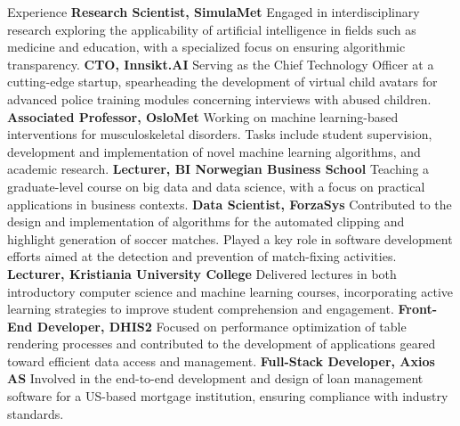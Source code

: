 \begin{rubric}{Experience}
%
\entry*[2021 -- present]%
\textbf{Research Scientist, SimulaMet} Engaged in interdisciplinary research exploring the applicability of artificial intelligence in fields such as medicine and education, with a specialized focus on ensuring algorithmic transparency.
%
\entry*[2023 -- present]%
\textbf{CTO, Innsikt.AI} Serving as the Chief Technology Officer at a cutting-edge startup, spearheading the development of virtual child avatars for advanced police training modules concerning interviews with abused children.
%
\entry*[2023 -- present]%
\textbf{Associated Professor, OsloMet} Working on machine learning-based interventions for musculoskeletal disorders. Tasks include student supervision, development and implementation of novel machine learning algorithms, and academic research.
%
\entry*[2023 -- present]%
\textbf{Lecturer, BI Norwegian Business School} Teaching a graduate-level course on big data and data science, with a focus on practical applications in business contexts.
%
\entry*[2022 -- 2023]%
\textbf{Data Scientist, ForzaSys} Contributed to the design and implementation of algorithms for the automated clipping and highlight generation of soccer matches. Played a key role in software development efforts aimed at the detection and prevention of match-fixing activities.
%
\entry*[2019 -- 2020]%
\textbf{Lecturer, Kristiania University College} Delivered lectures in both introductory computer science and machine learning courses, incorporating active learning strategies to improve student comprehension and engagement.
%
\entry*[2017 -- 2018]%
\textbf{Front-End Developer, DHIS2} Focused on performance optimization of table rendering processes and contributed to the development of applications geared toward efficient data access and management.
%
\entry*[2014 -- 2016]%
\textbf{Full-Stack Developer, Axios AS} Involved in the end-to-end development and design of loan management software for a US-based mortgage institution, ensuring compliance with industry standards.
%
\end{rubric}